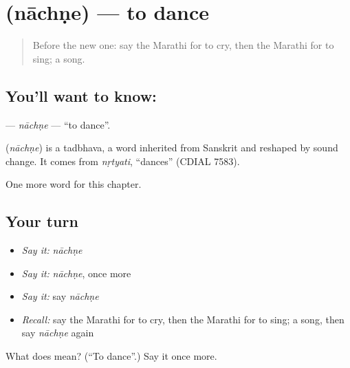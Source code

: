 \section[\texorpdfstring{\mr{नाचणे} (nāchṇe)}{नाचणे (nāchṇe)}]{ (nāchṇe) — to dance}

\label{lesson:MR-C79-nachne}



\begin{quote}
Before the new one: say the Marathi for to cry, then the Marathi for to sing; a song.
\end{quote}

\subsection*{You'll want to know: }
\textbf{} — \emph{nāchṇe} — \textquotedblleft{}to dance\textquotedblright{}.

\begin{cousinweb}
\textbf{} (\emph{nāchṇe}) is a tadbhava, a word inherited from Sanskrit and reshaped by sound change. It comes from \emph{nṛtyati}, \textquotedblleft{}dances\textquotedblright{} (CDIAL 7583).
\end{cousinweb}

\begin{grammarlens}[title={What you've built}]
One more word for this chapter.
\end{grammarlens}

\subsection*{Your turn}
\begin{itemize}
\raggedright
  \item \emph{Say it:} \emph{nāchṇe}
  \item \emph{Say it:} \emph{nāchṇe}, once more
  \item \emph{Say it:} say \emph{nāchṇe}
  \item \emph{Recall:} say the Marathi for to cry, then the Marathi for to sing; a song, then say \emph{nāchṇe} again
\end{itemize}

\begin{tcolorbox}[breakable,colback=teal!4,colframe=teal!35!black,title={Before you move on}]
What does  mean? (\textquotedblleft{}To dance\textquotedblright{}.) Say it once more.
\end{tcolorbox}
